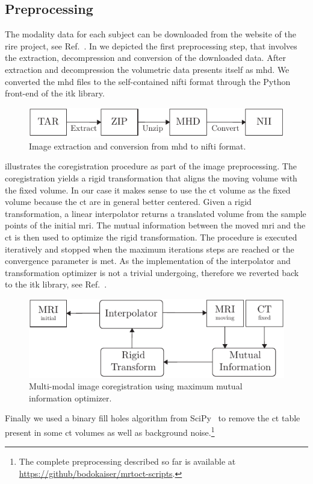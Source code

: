 \subsection{Preprocessing}

The modality data for each subject can be downloaded from the website of the
\gls{rire} project, see Ref.~\cite{RIRE}. In  we depicted
the first preprocessing step, that involves the extraction, decompression and
conversion of the downloaded data. After extraction and decompression the
volumetric data presents itself as \gls{mhd}. We converted the \gls{mhd} files
to the self-contained \gls{nifti} format through the Python front-end of the
\gls{itk} library.
\begin{figure}[h]
  \centering
  \includegraphics[width=\linewidth]{figure/conversion.pdf}
  \caption{Image extraction and conversion from \gls{mhd} to \gls{nifti}
		format.
	}\label{fig:conversion}
\end{figure}
 illustrates the coregistration procedure as part of
the image preprocessing. The coregistration yields a rigid transformation that
aligns the moving volume with the fixed volume. In our case it makes sense to
use the \gls{ct} volume as the fixed volume because the \gls{ct} are in
general better centered. Given a rigid transformation, a linear interpolator
returns a translated volume from the sample points of the initial \gls{mri}.
The mutual information between the moved \gls{mri} and the \gls{ct} is then
used to optimize the rigid transformation. The procedure is executed
iteratively and stopped when the maximum iterations steps are reached or
the convergence parameter is met. As the implementation of the interpolator
and transformation optimizer is not a trivial undergoing, therefore we
reverted back to the \gls{itk} library, see Ref.~\cite{Yaniv2018}.
\begin{figure}[h]
  \centering
  \includegraphics[width=\linewidth]{figure/registration.pdf}
  \caption{Multi-modal image coregistration using maximum mutual information
    optimizer.
	}\label{fig:registration}
\end{figure}
Finally we used a binary fill holes algorithm from SciPy~\cite{SciPy} to
remove the \gls{ct} table present in some \gls{ct} volumes as well as
background noise.\footnote{The complete preprocessing described so far is
available at \url{https://github/bodokaiser/mrtoct-scripts}.}

